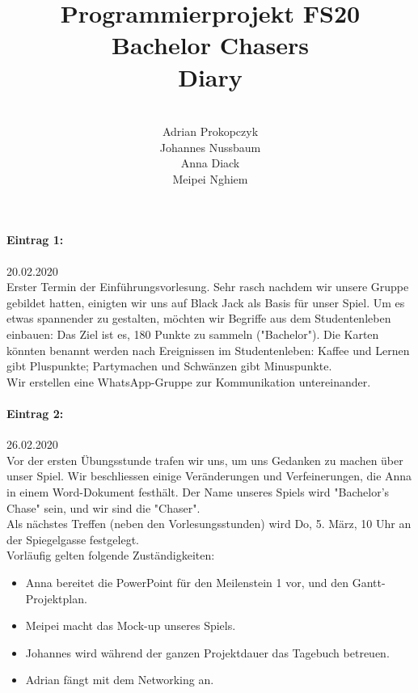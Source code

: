 \documentclass[12pt]{article}
\title{Programmierprojekt FS20\\Bachelor Chasers\\Diary}
\author{\\Adrian Prokopczyk\\Johannes Nussbaum\\Anna Diack\\Meipei Nghiem}
\date{}
\begin{document}
\begin{titlepage}

\maketitle
\thispagestyle{empty}
\setcounter{tocdepth}{2}

\end{titlepage}

\paragraph{Eintrag 1:}
20.02.2020 \\
Erster Termin der Einf\"uhrungsvorlesung. Sehr rasch nachdem wir unsere Gruppe gebildet hatten, einigten wir uns auf Black Jack als Basis für unser Spiel. Um es etwas spannender zu gestalten, m\"ochten wir Begriffe aus dem Studentenleben einbauen: Das Ziel ist es, 180 Punkte zu sammeln ("Bachelor"). Die Karten k\"onnten benannt werden nach Ereignissen im Studentenleben: Kaffee und Lernen gibt Pluspunkte; Partymachen und Schw\"anzen gibt Minuspunkte.\\
Wir erstellen eine WhatsApp-Gruppe zur Kommunikation untereinander.

\paragraph{Eintrag 2:}
26.02.2020\\
Vor der ersten \"Ubungsstunde trafen wir uns, um uns Gedanken zu machen \"uber unser Spiel. Wir beschliessen einige Veränderungen und Verfeinerungen, die Anna in einem Word-Dokument festh\"alt. Der Name unseres Spiels wird "Bachelor's Chase" sein, und wir sind die "Chaser".\\
Als n\"achstes Treffen (neben den Vorlesungsstunden) wird Do, 5. M\"arz, 10 Uhr an der Spiegelgasse festgelegt.\\
Vorl\"aufig gelten folgende Zust\"andigkeiten:
\begin{itemize}
\item Anna bereitet die PowerPoint für den Meilenstein 1 vor, und den Gantt-Projektplan.
\item Meipei macht das Mock-up unseres Spiels.
\item Johannes wird während der ganzen Projektdauer das Tagebuch betreuen.
\item Adrian f\"angt mit dem Networking an.
\end{itemize}
\end{document}
